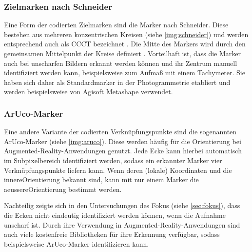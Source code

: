 \documentclass[./00PhotoBox.tex]{subfiles}
\begin{document}
\subsubsection{Zielmarken nach Schneider}
Eine Form der codierten Zielmarken sind die Marker nach Schneider. Diese bestehen aus mehreren konzentrischen Kreisen (siehe \autoref{img:schneider}) und werden entsprechend auch als \Gls{CCCT} bezeichnet \citep[vgl.][]{ccct}. Die Mitte des Markers wird durch den gemeinsamen Mittelpunkt der Kreise definiert \citep[vgl.][]{schneider}. Vorteilhaft ist, dass die Marker auch bei unscharfen Bildern erkannt werden können und ihr Zentrum manuell identifiziert werden kann, beispielsweise zum Aufmaß mit einem Tachymeter. Sie haben sich daher als Standardmarker in der Photogrammetrie etabliert und werden beispielsweise von Agisoft Metashape verwendet.


\subsubsection{ArUco-Marker}
Eine andere Variante der codierten Verknüpfungspunkte sind die sogenannten ArUco-Marker (siehe \autoref{img:aruco}). Diese werden häufig für die Orientierung bei Augmented-Reality-An\-wend\-ungen genutzt. Jede Ecke kann hierbei automatisch im Subpixelbereich identifiziert werden, sodass ein erkannter Marker vier Verknüpfungspunkte liefern kann. Wenn deren (lokale) Koordinaten und die \gls{innereOrientierung} bekannt sind, kann mit nur einem Marker die \gls{aeussereOrientierung} bestimmt werden. \citep[vgl.][S. 545]{luhmann}

Nachteilig zeigte sich in den Untersuchungen des Fokus (siehe \autoref{sec:fokus}), dass die Ecken nicht eindeutig identifiziert werden können, wenn die Aufnahme unscharf ist. Durch ihre Verwendung in Augmented-Reality-Anwendungen sind auch viele kostenfreie Bibliotheken für ihre Erkennung verfügbar, sodass beispielsweise \citet{opencv} ArUco-Marker identifizieren kann.
\end{document}
